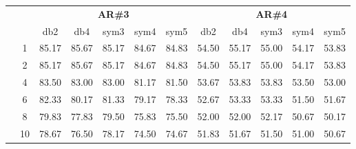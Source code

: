 \begin{table}[htpb]
\begin{tabular}{|c|c|c c c c c|c c c c c|}
\cline{3-12}
\multicolumn{2}{c}{} & \multicolumn{5}{|c|}{\textbf{AR\#3}}  & \multicolumn{5}{c|}{\textbf{AR\#4}} \\\cline{3-12}
\multicolumn{2}{c}{}  & \multicolumn{1}{|c}{db2} & db4 & sym3 & sym4 & sym5 & db2 & db4& sym3 & sym4 & sym5 \\\hline
\multicolumn{1}{|c|}{ \multirow{6}{*}{\rotatebox[origin=c]{90}{\textbf{K-vizinhos}}} }
&1	&85.17	&85.67	&85.17	&84.67	&84.83	&54.50	&55.17	&55.00	&54.17	&53.83\\\cline{2-12}
&2	&85.17	&85.67	&85.17	&84.67	&84.83	&54.50	&55.17	&55.00	&54.17	&53.83\\\cline{2-12}
&4	&83.50	&83.00	&83.00	&81.17	&81.50	&53.67	&53.83	&53.83	&53.50	&53.00\\\cline{2-12}
&6	&82.33	&80.17	&81.33	&79.17	&78.33	&52.67	&53.33	&53.33	&51.50	&51.67\\\cline{2-12}
&8	&79.83	&77.83	&79.50	&75.83	&75.50	&52.00	&52.00	&52.17	&50.67	&50.17\\\cline{2-12}
&10	&78.67	&76.50	&78.17	&74.50	&74.67	&51.83	&51.67	&51.50	&51.00	&50.67%

\\\midrule
\end{tabular}

\end{table}

















